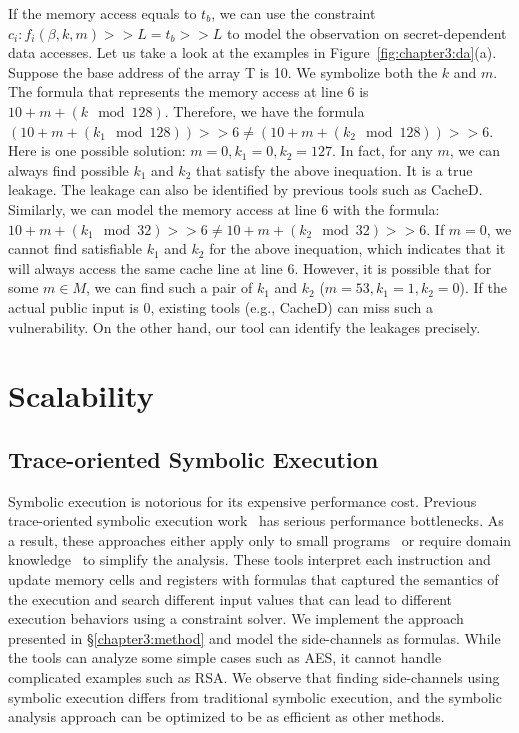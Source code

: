 If the memory access equals to $t_b$, we can use the constraint $c_i :
  f_i(\beta, k, m) >> L = t_b >> L$ to model the observation on secret-dependent
data accesses. Let us take a look at the examples in Figure~\ref{fig:chapter3:da}(a).
Suppose the base address of the array \textsf{T} is 10. We symbolize both the $k$ and $m$. The formula that represents the memory access at line 6 is $10 + m + (k \mod 128)$. Therefore, we have the formula $(10 + m + (k_1 \mod 128)) >> 6  \neq (10 + m + (k_2 \mod 128)) >> 6$.
Here is one possible solution: $m = 0, k_1 = 0, k_2 = 127$. In fact, for any $m$, we can always find possible $k_1$ and $k_2$ that satisfy the above inequation. It is a true leakage. The leakage can also be identified by previous tools such as CacheD. Similarly, we can model the memory access at line 6 with the formula:  $10 + m + (k_1 \mod 32) >> 6  \neq 10 + m + (k_2 \mod 32) >> 6$. If $m = 0$, we cannot find satisfiable $k_1$ and $k_2$ for the above inequation, which indicates that it will always access the same cache line at line 6. However, it is possible that for some $m \in M$, we can find such a pair of $k_1$ and $k_2$ ($m = 53, k_1 = 1, k_2 = 0$). If the actual public input is $0$, existing tools (e.g., CacheD) can miss such a vulnerability. On the other hand, our tool can identify the leakages precisely.

\section{Scalability}
\subsection{Trace-oriented Symbolic Execution}
Symbolic execution is notorious for its expensive performance cost.
Previous trace-oriented symbolic execution
work~\cite{203878,Chattopadhyay:2017:QIL:3127041.3127044} has serious
performance bottlenecks. As a result, these approaches either apply only to
small programs~\cite{Chattopadhyay:2017:QIL:3127041.3127044} or require
domain knowledge~\cite{Wang:2007:NCD:1250662.1250723} to simplify the analysis.
These tools interpret each
instruction and update memory cells and registers with formulas that
captured the semantics of the execution and search different input values that
can lead to different execution behaviors using a constraint solver.
We implement the approach presented in \S\ref{chapter3:method} and model the side-channels as formulas. While the tools can analyze some simple cases such as AES, it cannot handle complicated examples such as RSA.
We observe that finding side-channels using symbolic execution differs from
traditional symbolic execution, and the symbolic analysis approach can be optimized to be as efficient
as other methods.

